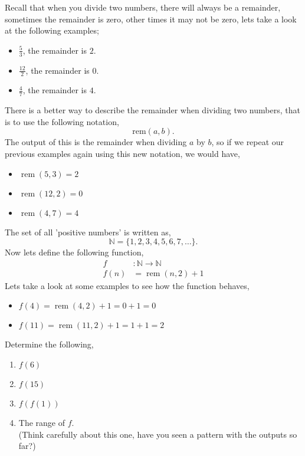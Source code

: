 \documentclass[12pt]{article} %
\newcommand{\rem}[1]{\operatorname{rem}{(#1)}}
\begin{document}
\begin{qstn} Recall that when you divide two numbers, there will always be a remainder, sometimes the remainder is zero, other
  times it may not be zero, lets take a look at the following examples;
  \begin{itemize}
    \item $\frac{5}{3}$, the remainder is $2$.
    \item $\frac{12}{2}$, the remainder is $0$.
    \item $\frac{4}{7}$, the remainder is $4$. 
  \end{itemize}
  There is a better way to describe the remainder when dividing two numbers, that is to use the following notation,
  \[
        \text{rem}(a,b)
  .\] The output of this is the remainder when dividing $a$ by $b$, so if we repeat our previous examples again using this new
  notation, we would have,
  \begin{itemize}
    \item $\operatorname{rem}(5,3) = 2$
    \item $\operatorname{rem}(12,2) = 0$
    \item $\operatorname{rem}(4,7) = 4$
  \end{itemize}
  The set of all 'positive numbers' is written as,
  \[
        \mathbb N = \{1,2,3,4,5,6,7,\dots\} 
  .\] Now lets define the following function,
  \begin{align*}
    f &\colon \mathbb N \to \mathbb N\\
    f(n) &= \rem{n,2} + 1
  \end{align*}
  Lets take a look at some examples to see how the function behaves,
  \begin{itemize}
    \item $f(4) = \rem{4,2} + 1 = 0 + 1 = 0$
    \item $f(11) = \rem{11,2} + 1 = 1 + 1 = 2$
  \end{itemize}
  Determine the following,
  \begin{enumerate}[label=(\alph*)]
    \item $f(6)$
    \item $f(15)$
    \item $f(f(1))$
    \item The range of $f$.\\
      (Think carefully about this one, have you seen a pattern with the outputs so far?)
  \end{enumerate}

\end{qstn}
\end{document}

